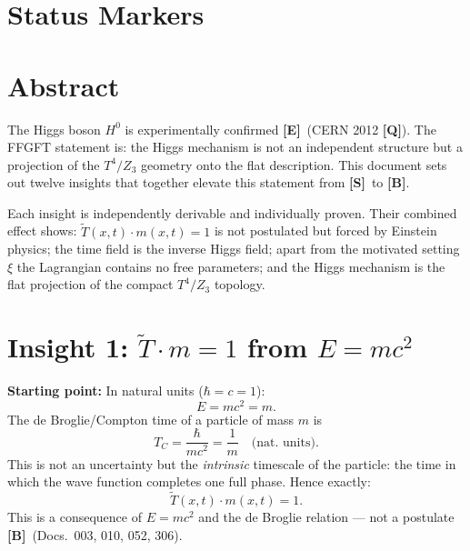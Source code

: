 \providecommand{\BM}{\textbf{[B]}}
\providecommand{\KM}{\textbf{[K]}}
\providecommand{\SM}{\textbf{[S]}}
\providecommand{\XM}{\textbf{[X]}}
\providecommand{\QM}{\textbf{[Q]}}

{}

\section*{Status Markers}


\section*{Abstract}

The Higgs boson $H^0$ is experimentally confirmed \textbf{[E]}\ (CERN 2012 \QM).
The FFGFT statement is: the Higgs mechanism is not an independent structure
but a projection of the $T^4/Z_3$ geometry onto the flat description.
This document sets out twelve insights that together elevate this statement
from \SM\ to \BM.

Each insight is independently derivable and individually proven. Their
combined effect shows: $\tilde{T}(x,t)\cdot m(x,t) = 1$ is not postulated
but forced by Einstein physics; the time field is the inverse Higgs field;
apart from the motivated setting $\xi$ the Lagrangian contains no free parameters; and the Higgs
mechanism is the flat projection of the compact $T^4/Z_3$ topology.

\section{Insight 1: $\tilde{T}\cdot m = 1$ from $E = mc^2$}

\textbf{Starting point:} In natural units ($\hbar = c = 1$):
\begin{equation}
  E = mc^2 = m.
  \label{eq:Emc2}
\end{equation}
The de Broglie/Compton time of a particle of mass $m$ is
\begin{equation}
  T_C = \frac{\hbar}{mc^2} = \frac{1}{m}
  \quad\text{(nat.\ units)}.
  \label{eq:compton}
\end{equation}
This is not an uncertainty but the \emph{intrinsic} timescale of the
particle: the time in which the wave function completes one full phase.
Hence exactly:
\begin{equation}
  \boxed{\tilde{T}(x,t)\cdot m(x,t) = 1.}
  \label{eq:duality}
\end{equation}
This is a consequence of $E = mc^2$ and the de Broglie relation ---
not a postulate \BM\ (Docs.~003, 010, 052, 306).

